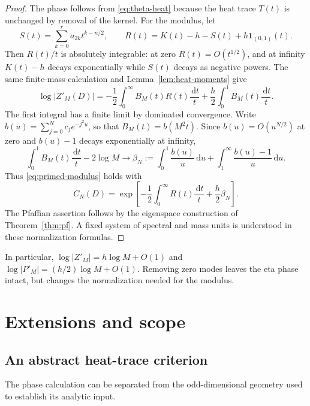 \documentclass[11pt,a4paper]{article}
\theoremstyle{remark}
\newcommand{\dd}{\,\mathrm d}
\numberwithin{equation}{section}
\begin{document}
\begin{proof}
The phase follows from \eqref{eq:theta-heat} because the heat trace
$T(t)$ is unchanged by removal of the kernel. For the modulus, let
\[
 S(t)=\sum_{k=0}^r a_{2k}t^{k-n/2},\qquad
 R(t)=K(t)-h-S(t)+h\mathbf1_{(0,1)}(t).
\]
Then $R(t)/t$ is absolutely integrable: at zero $R(t)=O(t^{1/2})$,
and at infinity $K(t)-h$ decays exponentially while $S(t)$ decays
as negative powers. The same finite-mass calculation and
Lemma~\ref{lem:heat-moments} give
\begin{equation}\label{eq:primed-log}
 \log|Z'_M(D)|
 =-\frac12\int_0^\infty B_M(t)R(t)\frac{\dd t}{t}
   +\frac h2\int_0^1 B_M(t)\frac{\dd t}{t}.
\end{equation}
The first integral has a finite limit by dominated convergence.
Write $b(u)=\sum_{j=0}^Nc_je^{-j^2u}$, so that $B_M(t)=b(M^2t)$.
Since $b(u)=O(u^{N/2})$ at zero and $b(u)-1$ decays exponentially
at infinity,
\begin{equation}\label{eq:b-constant}
 \int_0^1 B_M(t)\frac{\dd t}{t}-2\log M
 \longrightarrow
 \beta_N:=\int_0^1\frac{b(u)}u\dd u
          +\int_1^\infty\frac{b(u)-1}{u}\dd u.
\end{equation}
Thus \eqref{eq:primed-modulus} holds with
\begin{equation}\label{eq:C-primed}
 C_N(D)=\exp\!\left[-\frac12\int_0^\infty R(t)\frac{\dd t}{t}
                              +\frac h2\beta_N\right].
\end{equation}
The Pfaffian assertion follows by the eigenspace construction of
Theorem~\ref{thm:pf}. A fixed system of spectral and mass units is
understood in these normalization formulas.
\end{proof}

In particular, $\log|Z'_M|=h\log M+O(1)$ and
$\log|P'_M|=(h/2)\log M+O(1)$. Removing zero modes leaves the eta
phase intact, but changes the normalization needed for the modulus.

\section{Extensions and scope}\label{sec:extensions}

\subsection{An abstract heat-trace criterion}

The phase calculation can be separated from the odd-dimensional
geometry used to establish its analytic input.
\end{document}
